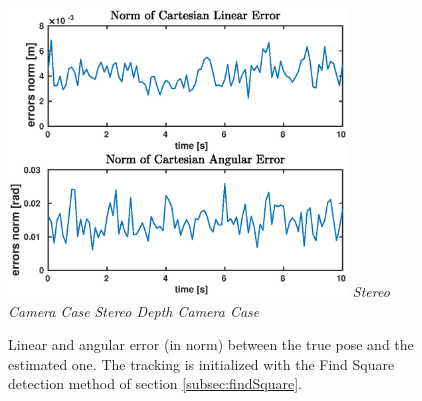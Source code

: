 \begin{figure}
{		\includegraphics[width=9cm]{tracking/square-depth.eps}
	}
	\hspace*{20px}\textit{Stereo Camera Case} \hspace{135px} \textit{Stereo Depth Camera Case}\\
	\vspace{30px}
	\caption[Tracking error plots with find square detection initialization]{Linear and angular error (in norm) between the true pose and the estimated one. The tracking is initialized with the Find Square detection method of section \ref{subsec:findSquare}.}
	\label{fig:squareErrors}
\end{figure}

